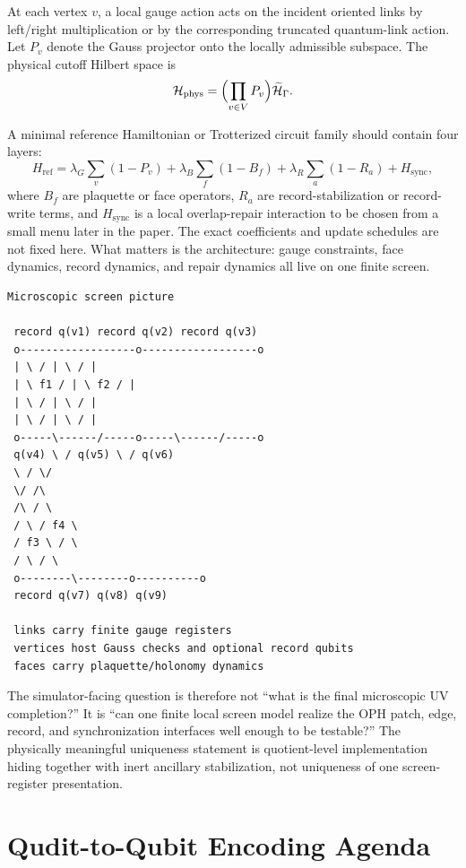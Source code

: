 \documentclass[11pt]{article}
\begin{document}
At each vertex $v$, a local gauge action acts on the incident oriented links by left/right
multiplication or by the corresponding truncated quantum-link action. Let $P_v$ denote the
Gauss projector onto the locally admissible subspace. The physical cutoff Hilbert space is
\begin{equation}
\mathcal H_{\mathrm{phys}} = \Bigl(\prod_{v\in V}P_v\Bigr)\widetilde{\mathcal H}_{\Gamma}.
\end{equation}

A minimal reference Hamiltonian or Trotterized circuit family should contain four layers:
\begin{equation}
H_{\mathrm{ref}} =
\lambda_G\sum_{v}(1-P_v)
+\lambda_B\sum_{f}(1-B_f)
+\lambda_R\sum_{a}(1-R_a)
+H_{\mathrm{sync}},
\end{equation}
where $B_f$ are plaquette or face operators, $R_a$ are record-stabilization or record-write
terms, and $H_{\mathrm{sync}}$ is a local overlap-repair interaction to be chosen from a small
menu later in the paper. The exact coefficients and update schedules are not fixed here.
What matters is the architecture: gauge constraints, face dynamics, record dynamics, and
repair dynamics all live on one finite screen.

\begin{verbatim}
Microscopic screen picture

 record q(v1) record q(v2) record q(v3)
 o------------------o------------------o
 | \ / | \ / |
 | \ f1 / | \ f2 / |
 | \ / | \ / |
 | \ / | \ / |
 o-----\------/-----o-----\------/-----o
 q(v4) \ / q(v5) \ / q(v6)
 \ / \/
 \/ /\
 /\ / \
 / \ / f4 \
 / f3 \ / \
 / \ / \
 o--------\--------o----------o
 record q(v7) q(v8) q(v9)

 links carry finite gauge registers
 vertices host Gauss checks and optional record qubits
 faces carry plaquette/holonomy dynamics
\end{verbatim}

The simulator-facing question is therefore not ``what is the final microscopic UV completion?'' It is
``can one finite local screen model realize the OPH patch, edge, record, and synchronization
interfaces well enough to be testable?'' The physically meaningful
uniqueness statement is quotient-level implementation hiding together with inert ancillary
stabilization, not uniqueness of one screen-register presentation.

\section{Qudit-to-Qubit Encoding Agenda}
\end{document}
